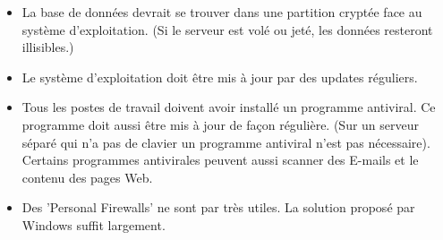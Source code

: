 \documentclass[a4paper]{scrartcl}
\begin{document}
\begin{itemize}
\item La base de données devrait se trouver dans une partition cryptée face au système d'exploitation. (Si le serveur est volé ou jeté, les données resteront illisibles.)

\item Le système d'exploitation doit être mis à jour par des updates réguliers.

\item Tous les postes de travail doivent avoir installé un programme antiviral. Ce programme doit aussi être mis à jour de façon régulière. (Sur un serveur séparé qui n'a pas de clavier un programme antiviral n'est pas nécessaire). Certains programmes antivirales peuvent aussi scanner des E-mails et le contenu des pages Web.

\item Des 'Personal Firewalls' ne sont par très utiles. La solution proposé par Windows suffit largement.

\end{itemize}
\end{document}
